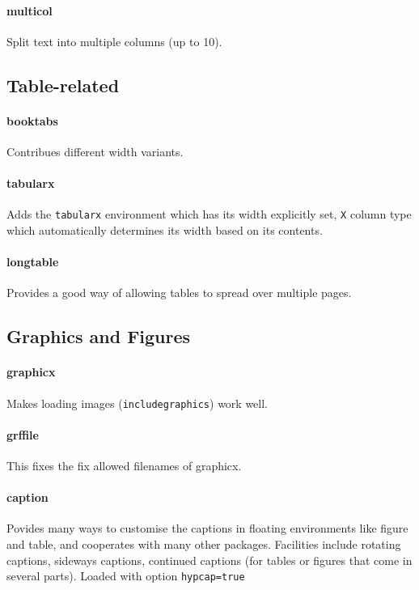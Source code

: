 \documentclass[solid,math,chem,code,plot,gloss]{bmc}
\begin{document}
\paragraph{\ttfamily multicol}\label{par:multicol}
Split text into multiple columns (up to 10).

\subsection{Table-related}

\paragraph{\ttfamily booktabs}\label{par:booktabs}
Contribues different width \texttt{\hline} variants.
\paragraph{\ttfamily tabularx}\label{par:tabularx}
Adds the \texttt{tabularx} environment which has its width explicitly set,
\texttt{X} column type which automatically determines its width based on its contents.
\paragraph{\ttfamily longtable}\label{par:longtable}
Provides a good way of allowing tables to spread over multiple pages.

\subsection{Graphics and Figures}

\paragraph{\ttfamily graphicx}\label{par:graphicx}
Makes loading images (\texttt{includegraphics}) work well.
\paragraph{\ttfamily grffile}\label{par:grffile}
This fixes the fix allowed filenames of graphicx.
\paragraph{\ttfamily caption}\label{par:caption}
Povides many ways to customise the captions in floating environments like figure and table,
and cooperates with many other packages.
Facilities include rotating captions, sideways captions, continued captions (for tables or figures that come in several parts).
Loaded with option \texttt{hypcap=true}
\end{document}
